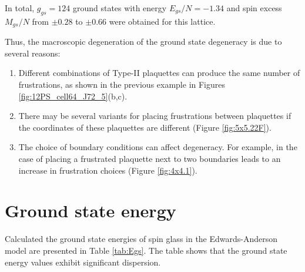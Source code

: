 \documentclass[preprint,12pt]{elsarticle}
\begin{document}
In total, $g_{gs}=124$ ground states with energy $E_{gs}/N=-1.34$ and spin excess $M_{gs}/N$ from $\pm 0.28$ to $\pm 0.66$ were obtained for this lattice. 

Thus, the macroscopic degeneration of the ground state degeneracy is due to several reasons:

\begin{enumerate}
	\item Different combinations of Type-II plaquettes can produce the same number of frustrations, as shown in the previous example in Figures \ref{fig:12PS_cell64_J72_5}(b,c).
	\item There may be several variants for placing frustrations between plaquettes if the coordinates of these plaquettes are different (Figure \ref{fig:5x5.22F}).
	\item The choice of boundary conditions can affect degeneracy. For example, in the case of placing a frustrated plaquette next to two boundaries leads to an increase in frustration choices (Figure \ref{fig:4x4.1}).
\end{enumerate}

\section{Ground state energy}

Calculated the ground state energies of spin glass in the Edwards-Anderson model are presented in Table \ref{tab:Egs}. The table shows that the ground state energy values exhibit significant dispersion.
\end{document}
